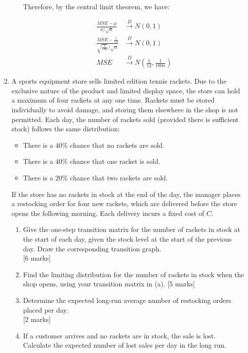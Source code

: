 \documentclass[12pt]{article}
\begin{document}
\begin{enumerate}
\begin{enumerate}
Therefore, by the central limit theorem, we have:

\begin{align*}
\frac{MSE - \mu}{\sigma/\sqrt{n}} &\xrightarrow{D} N(0, 1) \\
\frac{MSE - \frac{1}{12}}{\sqrt{\frac{1}{180}}/\sqrt{n}} &\xrightarrow{D} N(0, 1) \\
MSE &\xrightarrow{D} N\left(\frac{1}{12}, \frac{1}{180n}\right)
\end{align*}

\end{enumerate}

\vspace{5pt}
\item A sports equipment store sells limited edition tennis rackets. Due to the exclusive nature of the product and limited display space, the store can hold a maximum of four rackets at any one time. Rackets must be stored individually to avoid damage, and storing them elsewhere in the shop is not permitted.
%
Each day, the number of rackets sold (provided there is sufficient stock) follows the same distribution:
\begin{itemize}
	\item There is a 40\% chance that no rackets are sold.
	\item There is a 40\% chance that one racket is sold.
	\item There is a 20\% chance that two rackets are sold.
	\end{itemize}
%
If the store has no rackets in stock at the end of the day, the manager places a restocking order for four new rackets, which are delivered before the store opens the following morning. Each delivery incurs a fixed cost of $C$.  
%
\begin{enumerate}
\item Give the one-step transition matrix for the number of rackets in stock at the start of each day, given the stock level at the start of the previous day. Draw the corresponding transition graph. 
			\\\phantom{1}\hfill [6 marks]
%
\item Find the limiting distribution for the number of rackets in stock when the shop opens, using your transition matrix in (a). 
			\hfill [5 marks]
%
\item Determine the expected long-run average number of restocking orders placed per day. 
			\\\phantom{1}\hfill [2 marks]
%
\item If a customer arrives and no rackets are in stock, the sale is lost. Calculate the expected number of lost sales per day in the long run. 

\end{enumerate}
\end{enumerate}
\end{document}
